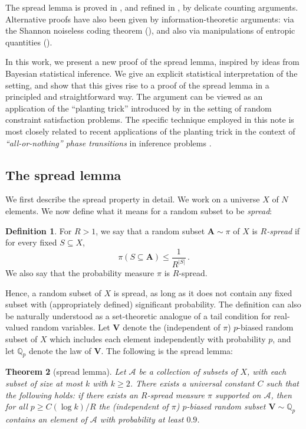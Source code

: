 \documentclass[11pt,reqno]{amsart}
\theoremstyle{plain}
\newtheorem{theorem}{Theorem}[section]
\theoremstyle{definition}
\newtheorem{definition}[theorem]{Definition}
\theoremstyle{remark}
\newcommand{\Q}{\mathbb{Q}}
\newcommand{\bA}{\mathbf{A}}
\newcommand{\bV}{\mathbf{V}}
\begin{document}
The spread lemma is proved in \cite{sunflower_annals},
and refined in \cite{fracKK_annals}, by delicate counting arguments. Alternative proofs have also been given by information-theoretic arguments: via the Shannon noiseless coding theorem (\cite{Rao_sunflower}), and also via manipulations of entropic quantities (\cite{Tao_sunflower}). 

In this work, we present a new proof of the spread lemma, inspired by ideas from Bayesian statistical inference. We give an explicit statistical interpretation of the setting, and show that this gives rise to a proof of the spread lemma in a principled and straightforward way. The argument can be viewed as an application of the ``planting trick'' introduced by
\cite{Dim_Amin} in the setting of random constraint satisfaction problems. The specific technique employed in this note is most closely related to recent applications of the planting trick in the context of \emph{``all-or-nothing'' phase transitions} in inference problems \cite{coja2022statistical}.


\subsection{The spread lemma} We first describe the spread property in detail. We work on a universe $X$ of $N$ elements. 
We now define what it means for a random subset to be \emph{spread}:
\begin{definition}\label{d:spread}
For $R>1$, we say that a random subset $\bA\sim \pi$ of $X$ is \emph{$R$-spread} if for every fixed $S \subseteq X$,  
	\begin{equation} \label{spread_cond}
	{\pi}(S \subseteq \bA) \leq \frac{1}{R^{|S|}}\,.
	\end{equation}
We also say that the probability measure $\pi$ is $R$-spread.
\end{definition}
Hence, a random subset of $X$ is spread, as long as it does not contain any fixed subset with (appropriately defined) significant probability. The definition can also be naturally understood as a set-theoretic analogue of a tail condition for real-valued random variables. Let $\bV$ denote the (independent of $\pi$) $p$-biased random subset of $X$ which includes each element independently with probability $p$, and let $\Q_p$ denote the law of $\bV$. The following is the spread lemma: 

\begin{theorem}[spread lemma]\label{thm:main}
Let $\mathscr{A}$ be a collection of subsets of $X$, with each subset of size at most $k$ with $k\ge2$. There exists a universal constant $C$ such that the following holds: if there exists an $R$-spread measure $\pi$ supported on $\mathscr{A}$, then for all $p \ge C(\log k)/R$ the (independent of $\pi$) $p$-biased random subset $\bV\sim\Q_p$ contains an element of $\mathscr{A}$ with probability at least $0.9$. \end{theorem}
\end{document}
